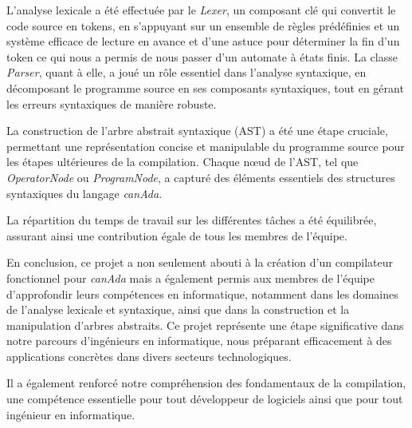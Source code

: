 \documentclass[french,a4paper]{article}
\begin{document}
    L'analyse lexicale a été effectuée par le \textit{Lexer}, un composant clé qui convertit le code source en tokens, en s'appuyant sur un ensemble de règles prédéfinies et un système efficace de lecture en avance et d'une astuce pour déterminer la fin d'un token ce qui nous a permis de nous passer d'un automate à états finis.
    La classe \textit{Parser}, quant à elle, a joué un rôle essentiel dans l'analyse syntaxique, en décomposant le programme source en ses composants syntaxiques, tout en gérant les erreurs syntaxiques de manière robuste.

    La construction de l'arbre abstrait syntaxique (AST) a été une étape cruciale, permettant une représentation concise et manipulable du programme source pour les étapes ultérieures de la compilation.
    Chaque nœud de l'AST, tel que \textit{OperatorNode} ou \textit{ProgramNode}, a capturé des éléments essentiels des structures syntaxiques du langage \textit{canAda}.

    La répartition du temps de travail sur les différentes tâches a été équilibrée, assurant ainsi une contribution égale de tous les membres de l'équipe.

    En conclusion, ce projet a non seulement abouti à la création d'un compilateur fonctionnel pour \textit{canAda} mais a également permis aux membres de l'équipe d'approfondir leurs compétences en informatique, notamment dans les domaines de l'analyse lexicale et syntaxique, ainsi que dans la construction et la manipulation d'arbres abstraits.
    Ce projet représente une étape significative dans notre parcours d'ingénieurs en informatique, nous préparant efficacement à des applications concrètes dans divers secteurs technologiques.

    Il a également renforcé notre compréhension des fondamentaux de la compilation, une compétence essentielle pour tout développeur de logiciels ainsi que pour tout ingénieur en informatique.
\end{document}
